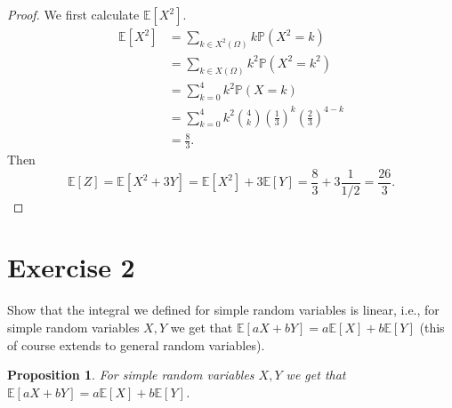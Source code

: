 \documentclass[12pt]{article}
\newtheorem{proposition}{Proposition}
\newenvironment{problem}
    {\begin{lrbox}{\mybox}\begin{minipage}{0.98\textwidth}}
    {\end{minipage}\end{lrbox}\framebox[\textwidth]{\usebox{\mybox}}}
\renewcommand{\P}{\mathbb{P}} %
\newcommand{\E}{\mathbb{E}} %
\newcommand{\<}{\left\langle} %
\renewcommand{\>}{\right\rangle} %
\begin{document}
\begin{proof}
    We first calculate $\E[X^2]$. 
    \begin{align*}
        \E[X^2]
            &= \sum_{k \in X^2(\Omega)} k \P(X^2 = k) \\
            &= \sum_{k \in X(\Omega)} k^2 \P(X^2 = k^2) \\
            &= \sum_{k = 0}^4 k^2 \P(X = k) \\
            &= \sum_{k = 0}^4 k^2 \binom{4}{k}\left(\frac13\right)^k\left(\frac23\right)^{4-k} \\
            &= \frac83.
    \end{align*}
    Then
    \[\E[Z] = \E[X^2 + 3Y] = \E[X^2] + 3\E[Y] = \frac83 + 3\frac1{1/2} = \frac{26}3.\]
    
\end{proof}

\newpage
\section*{Exercise 2}
\begin{problem}
    Show that the integral we defined for simple random variables is linear, i.e., for simple random variables $X, Y$ we get that $\E[aX + bY] = a \E[X] + b\E[Y]$ (this of course extends to general random variables).
\end{problem}

\begin{proposition}
    For simple random variables $X, Y$ we get that $\E[aX + bY] = a \E[X] + b\E[Y]$.
\end{proposition}
\end{document}
